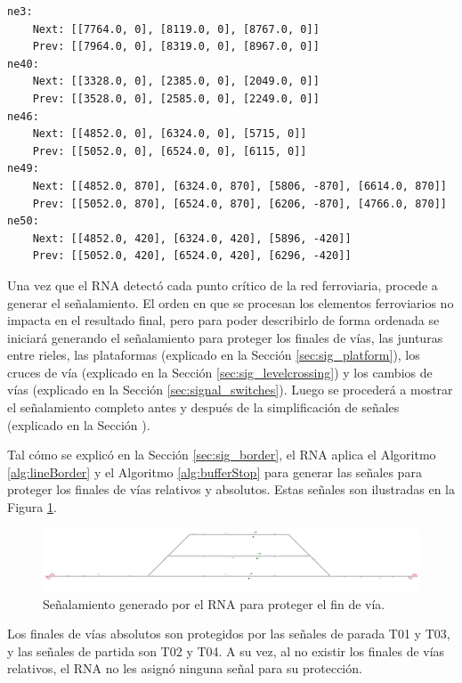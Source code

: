 	\begin{lstlisting}[language = {}, caption = SafePoints.RNA, label = {lst:EJ9_5}]
ne3:
	Next: [[7764.0, 0], [8119.0, 0], [8767.0, 0]]
	Prev: [[7964.0, 0], [8319.0, 0], [8967.0, 0]]
ne40:
	Next: [[3328.0, 0], [2385.0, 0], [2049.0, 0]]
	Prev: [[3528.0, 0], [2585.0, 0], [2249.0, 0]]
ne46:
	Next: [[4852.0, 0], [6324.0, 0], [5715, 0]]
	Prev: [[5052.0, 0], [6524.0, 0], [6115, 0]]
ne49:
	Next: [[4852.0, 870], [6324.0, 870], [5806, -870], [6614.0, 870]]
	Prev: [[5052.0, 870], [6524.0, 870], [6206, -870], [4766.0, 870]]
ne50:
	Next: [[4852.0, 420], [6324.0, 420], [5896, -420]]
	Prev: [[5052.0, 420], [6524.0, 420], [6296, -420]]
	\end{lstlisting}	
	
	Una vez que el RNA detectó cada punto crítico de la red ferroviaria, procede a generar el señalamiento. El orden en que se procesan los elementos ferroviarios no impacta en el resultado final, pero para poder describirlo de forma ordenada se iniciará generando el señalamiento para proteger los finales de vías, las junturas entre rieles, las plataformas (explicado en la Sección \ref{sec:sig_platform}), los cruces de vía (explicado en la Sección \ref{sec:sig_levelcrossing}) y los cambios de vías (explicado en la Sección \ref{sec:signal_switches}). Luego se procederá a mostrar el señalamiento completo antes y después de la simplificación de señales (explicado en la Sección \label{sec:simplificacion}). 
	
	Tal cómo se explicó en la Sección \ref{sec:sig_border}, el RNA aplica el Algoritmo \ref{alg:lineBorder} y el Algoritmo \ref{alg:bufferStop} para generar las señales para proteger los finales de vías relativos y absolutos. Estas señales son ilustradas en la Figura \ref{fig:EJ9_3}.

	\begin{figure}[H]
		\centering
		\includegraphics[width=1\textwidth]{resultados-obtenidos/ejemplo9/images/9_step1.png}
		\centering\caption{Señalamiento generado por el RNA para proteger el fin de vía.}
		\label{fig:EJ9_3}
	\end{figure}

	Los finales de vías absolutos son protegidos por las señales de parada T01 y T03, y las señales de partida son T02 y T04. A su vez, al no existir los finales de vías relativos, el RNA no les asignó ninguna señal para su protección.

